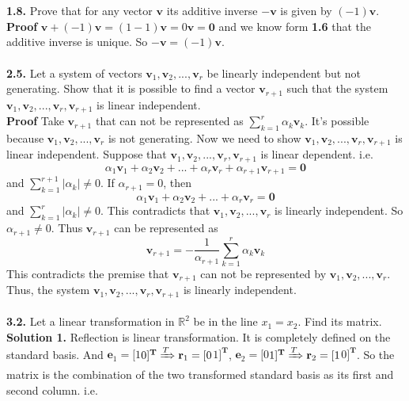 \documentclass[11pt, a4paper]{article}
\begin{document}
\\
\\ \textbf{1.8.} Prove that for any vector $\textbf{v}$ its additive inverse $-\textbf{v}$ is given by $(-1)\textbf{v}$.
\\ 
\textbf{Proof} $\textbf{v} + (-1)\textbf{v} = (1-1)\textbf{v} = 0\textbf{v} = \textbf{0}$ and we know form \textbf{1.6} that the additive inverse is unique. So $-\textbf{v} = (-1)\textbf{v}$.
\\
\\ \textbf{2.5.} Let a system of vectors $\textbf{v$_1$},\textbf{v$_2$},...,\textbf{v$_r$}$ be linearly independent but not generating. Show that it is possible to find a vector $\textbf{v$_{r+1}$}$ such that the system $\textbf{v$_1$},\textbf{v$_2$},...,\textbf{v$_r$},\textbf{v$_{r+1}$}$ is linear independent.
\\
\textbf{Proof} Take $\textbf{v$_{r+1}$}$ that can not be represented as $\sum_{k=1}^r\alpha_k\textbf{v$_k$}$. It's possible because $\textbf{v$_1$},\textbf{v$_2$},...,\textbf{v$_r$}$ is not generating. Now we need to show $\textbf{v$_1$},\textbf{v$_2$},...,\textbf{v$_r$},\textbf{v$_{r+1}$}$ is linear independent. Suppose that $\textbf{v$_1$},\textbf{v$_2$},...,\textbf{v$_r$},\textbf{v$_{r+1}$}$ is linear dependent. i.e. $$\alpha_1\textbf{v$_1$}+\alpha_2\textbf{v$_2$}+...+\alpha_r\textbf{v$_r$}+\alpha_{r+1}\textbf{v$_{r+1}$}=\textbf{0}$$ and $\sum_{k=1}^{r+1}|\alpha_k|\neq0$. If $\alpha_{r+1}=0$, then $$\alpha_1\textbf{v$_1$}+\alpha_2\textbf{v$_2$}+...+\alpha_r\textbf{v$_r$}=\textbf{0}$$ and $\sum_{k=1}^r|\alpha_k|\neq0$. This contradicts that $\textbf{v$_1$},\textbf{v$_2$},...,\textbf{v$_r$}$ is linearly independent. So $\alpha_{r+1}\neq0$. Thus $\textbf{v$_{r+1}$}$ can be represented as $$\textbf{v$_{r+1}$}=-\frac{1}{\alpha_{r+1}}\sum_{k=1}^r\alpha_k\textbf{v$_k$}$$This contradicts the premise that $\textbf{v$_{r+1}$}$ can not be represented by $\textbf{v$_1$},\textbf{v$_2$},...,\textbf{v$_r$}$. Thus, the system $\textbf{v$_1$},\textbf{v$_2$},...,\textbf{v$_r$},\textbf{v$_{r+1}$}$ is linearly independent.
\\
\\ \textbf{3.2.} Let a linear transformation in $\mathbb{R}^2$ be in the line $x_1 = x_2$. Find its matrix.\\
\textbf{Solution 1.} Reflection is linear transformation. It is completely defined on the standard basis.  And $\textbf{e$_1$}=[1 $\:$ 0]^{\textbf{T}}\xRightarrow{T} \textbf{r$_1$}= [0 $\:$ 1]^{\textbf{T}}$, $\textbf{e$_2$}=[0 $\:$ 1]^{\textbf{T}}\xRightarrow{T} \textbf{r$_2$} = [1 $\:$ 0]^{\textbf{T}}$. So the matrix is the combination of the two transformed standard basis as its first and second column. i.e.
\end{document}
